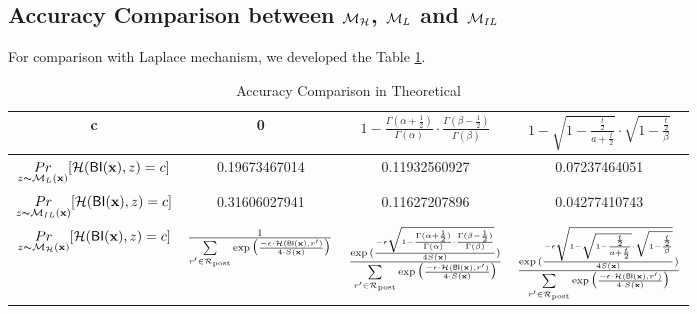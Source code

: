 \documentclass{article}
\begin{document}
\subsection{Accuracy Comparison between $\mathcal{M}_{\mathcal{H}}$, $\mathcal{M}_L$ and $\mathcal{M}_{IL}$}
For comparison with Laplace mechanism, we developed the Table \ref{tab_acc_theo}.
\begin{table}[h!]
\scriptsize
\centering
\begin{tabular}{ |c|c|c|c| } 
\hline
 c & 0 
 & $1 - \frac{\Gamma(\alpha+\frac{1}{2})}{\Gamma(\alpha)} \cdot
    \frac{\Gamma(\beta - \frac{1}{2})}{\Gamma(\beta)}$
 & $1 - 
    \sqrt{1 - \frac{\frac{t}{2}}{a + \frac{t}{2}}}
    \cdot
    \sqrt{1 - \frac{\frac{t}{2}}{\beta}}$  \\
 \hline
 $\underset{z \thicksim \mathcal{M}_L(\textbf{x})}{Pr}[\mathcal{H}(\mathsf{BI}(\textbf{x}), z ) = c] $
 & 0.19673467014 & 0.11932560927 & 0.07237464051 \\
 \hline
 $\underset{z \thicksim \mathcal{M}_{IL}(\textbf{x})}{Pr}[\mathcal{H}(\mathsf{BI}(\textbf{x}), z) = c]$
 & 0.31606027941 & 0.11627207896 & 0.04277410743 \\
 \hline
 $\underset{z \thicksim \mathcal{M}_{\mathcal{H}}(\textbf{x})}{Pr}[\mathcal{H}(\mathsf{BI}(\textbf{x}), z) = c]$
 & $\frac{1}{\sum\limits_{r'\in \mathcal{R}_{\textup{post}}} \exp \big(\frac{-\epsilon\cdot \mathcal{H} (\mathsf{BI}(\textbf{x}),r')}{4 \cdot S(\textbf{x})}\big)}$
 & $\frac{\exp{(\frac{- \epsilon \sqrt{1 - \frac{\Gamma(\alpha+\frac{1}{2})}{\Gamma(\alpha)} \cdot
 \frac{\Gamma(\beta - \frac{1}{2})}{\Gamma(\beta)}}}{4 S(\textbf{x})})}}{\sum\limits_{r'\in \mathcal{R}_{\textup{post}}} \exp \big(\frac{-\epsilon\cdot \mathcal{H} (\mathsf{BI}(\textbf{x}),r')}{4 \cdot S(\textbf{x})}\big)}$
 & $\frac{\exp{(\frac{- \epsilon \sqrt{1 - 
    \sqrt{1 - \frac{\frac{t}{2}}{a + \frac{t}{2}}}
    \cdot
    \sqrt{1 - \frac{\frac{t}{2}}{\beta}}}}
    {4 S(\textbf{x})})}}{\sum\limits_{r'\in \mathcal{R}_{\textup{post}}} \exp \big(\frac{-\epsilon\cdot \mathcal{H} (\mathsf{BI}(\textbf{x}),r')}{4 \cdot S(\textbf{x})}\big)}$\\
 \hline
\end{tabular}
\caption{Accuracy Comparison in Theoretical}
\label{tab_acc_theo}
\end{table}
\end{document}

